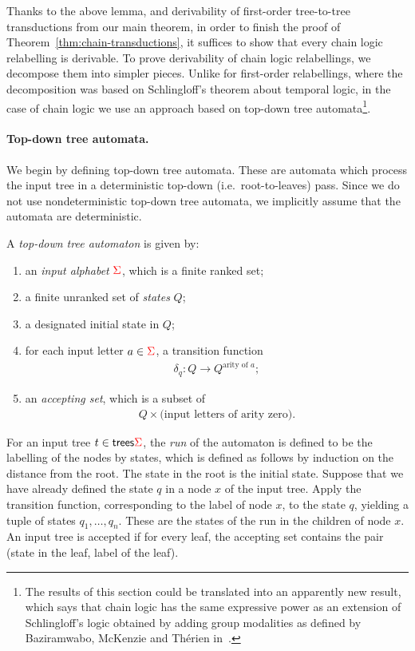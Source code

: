 Thanks to the above lemma, and derivability of first-order tree-to-tree transductions from our main theorem, 
in order to finish the proof of Theorem~\ref{thm:chain-transductions}, it suffices to show that every chain logic relabelling is derivable.  
To prove derivability of chain logic relabellings, we  decompose them into simpler pieces. Unlike for first-order relabellings, where the decomposition was based on Schlingloff's theorem about temporal logic, in the case of chain logic we use an approach based on top-down tree automata\footnote{The results of this section could be translated into an apparently new result, which says that chain logic has the same expressive power as an  extension of Schlingloff's logic obtained by adding group modalities as defined by Baziramwabo, McKenzie and  Th{\'e}rien in~\cite[Section 4]{baziramwabo1999modular}.}. 

\paragraph*{Top-down tree automata.}
We begin by defining top-down tree automata. 
These are automata which process the input tree in a deterministic top-down (i.e.~root-to-leaves)  pass. Since we do not use nondeterministic top-down tree automata, we implicitly assume that the automata are deterministic.


\begin{definition}
    A \emph{top-down tree automaton}  is given by:
    \begin{enumerate}
        \item an \emph{input alphabet} ${\color{red}{\Sigma}}$, which is a finite ranked set;
        \item a  finite unranked set of \emph{states} $Q$;
        \item a designated initial state in $Q$;
        \item \label{it:top-down-transition} for each input letter $a \in {\color{red}{\Sigma}}$, a transition function
        \begin{align*}
        \delta_q : Q \to Q^{\text{arity of $a$}};
        \end{align*}
        \item an \emph{accepting set}, which is a subset of 
        \begin{align*}
        Q \times \text{(input letters of arity zero)}.
        \end{align*}
    \end{enumerate}
\end{definition}
For an input tree $t \in \mathsf {trees} {\color{red}{\Sigma}}$, the \emph{run} of the automaton is defined to be the labelling of the nodes by states, which is  defined as follows by induction on the distance from the root. The state in the root is the initial state. Suppose that we have already defined the state $q$ in a node $x$ of the input tree. Apply the transition function, corresponding to the label of node $x$, to the state $q$, yielding a tuple of states $q_1,\ldots,q_n$. These are the states of the run in the children of node $x$. An input tree is accepted if for every leaf, the accepting set contains the pair (state in the leaf, label of the leaf). 




